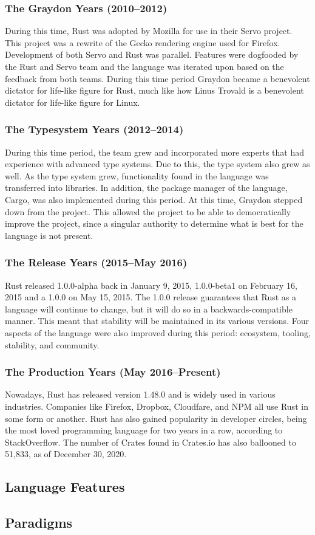 \documentclass{article}
\begin{document}
  \subsubsection{The Graydon Years (2010--2012)}
  During this time, Rust was adopted by Mozilla for use in their Servo project.
  This project was a rewrite of the Gecko rendering engine used for Firefox.
  Development of both Servo and Rust was parallel. Features were dogfooded by
  the Rust and Servo team and the language was iterated upon based on the
  feedback from both teams. During this time period Graydon became a benevolent
  dictator for life-like figure for Rust, much like how Linus Trovald is a
  benevolent dictator for life-like figure for Linux.

  \subsubsection{The Typesystem Years (2012--2014)}
  During this time period, the team grew and incorporated more experts that had
  experience with advanced type systems. Due to this, the type system also grew
  as well. As the type system grew, functionality found in the language was
  transferred into libraries. In addition, the package manager of the language,
  Cargo, was also implemented during this period. At this time, Graydon stepped
  down from the project. This allowed the project to be able to democratically
  improve the project, since a singular authority to determine what is best for
  the language is not present.

  \subsubsection{The Release Years (2015--May 2016)}
  Rust released 1.0.0-alpha back in January 9, 2015, 1.0.0-beta1 on February 16,
  2015 and a 1.0.0 on May 15, 2015. The 1.0.0 release guarantees that Rust as a
  language will continue to change, but it will do so in a backwards-compatible
  manner. This meant that stability will be maintained in its various versions.
  Four aspects of the language were also improved during this period: ecosystem,
  tooling, stability, and community.

  \subsubsection{The Production Years (May 2016--Present)}
  Nowadays, Rust has released version 1.48.0 and is widely used in various
  industries. Companies like Firefox, Dropbox, Cloudfare, and NPM all use Rust
  in some form or another. Rust has also gained popularity in developer circles,
  being the most loved programming language for two years in a row, according to
  StackOverflow. The number of Crates found in Crates.io has also ballooned to
  51,833, as of December 30, 2020.

  \subsection{Language Features}
  \subsection{Paradigms}


  \newpage
  \nocite{*} \printbibliography[heading=bibintoc,title={References}]{}
\end{document}
